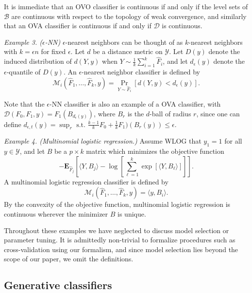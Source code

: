\documentclass{article}
\newcommand{\E}{\textbf{E}}
\begin{document}
It is immediate that an OVO classifier is continuous if and only if the level sets of $\mathcal{B}$ are continuous with respect
to the topology of weak convergence,
and similarly that an OVA classifier is continuous if and only if $\mathcal{D}$ is continuous.

\noindent\emph{Example 3. ($\epsilon$-NN)}  
$\epsilon$-nearest neighbors can be thought of as $k$-nearest neighbors with $k = \epsilon n$ for fixed $\epsilon$.
Let $d$ be a distance metric on $\mathcal{Y}$.  
Let $D(y)$ denote the induced distribution of $d(Y, y)$ when $Y \sim \frac{1}{k}\sum_{i=1}^k \hat{F}_i$,
and let $d_{\epsilon}(y)$ denote the $\epsilon$-quantile of $D(y)$. 
An $\epsilon$-nearest neighbor classifier is defined by
\[
\mathcal{M}_i(\hat{F}_1,\hdots, \hat{F}_k, y) = \Pr_{Y \sim \hat{F}_i}[d(Y, y) < d_{\epsilon}(y)].
\]

Note that the $\epsilon$-NN classifier is also an example of a OVA classifier, with 
$\mathcal{D}(F_0, F_1, y) = F_1(B_{d_{\epsilon}(y)})$, where $B_r$ is the $d$-ball of radius $r$,
since one can define $d_{\epsilon, t}(y) = \sup_r \text{ s.t. }\frac{k-1}{k}F_0 + \frac{1}{k}F_1)(B_r(y)) \leq \epsilon$.

\noindent\emph{Example 4. (Multinomial logistic regression.)}   
Assume WLOG that $y_1 = 1$ for all $y \in \mathcal{Y}$, and let $B$ be a $p \times k$ matrix which minimizes the objective function
\[
-\E_{\hat{F}_j}\left[\langle Y, B_j \rangle - \log\left[\sum_{\ell=1}^{k} \exp[\langle Y, B_\ell \rangle]\right]\right].
\]
A multinomial logistic regression classifier is defined by
\[
\mathcal{M}_i(\hat{F}_1,\hdots, \hat{F}_k, y) = \langle y, B_i \rangle.
\]
By the convexity of the objective function, multinomial logistic regression is continuous wherever the minimizer $B$
is unique.

Throughout these examples we have neglected to discuss model selection or parameter tuning.
It is admittedly non-trivial to formalize procedures such as cross-validation
using our formalism, and since model selection lies beyond the scope of our paper,
we omit the definitions.

\subsection{Generative classifiers}
\end{document}
